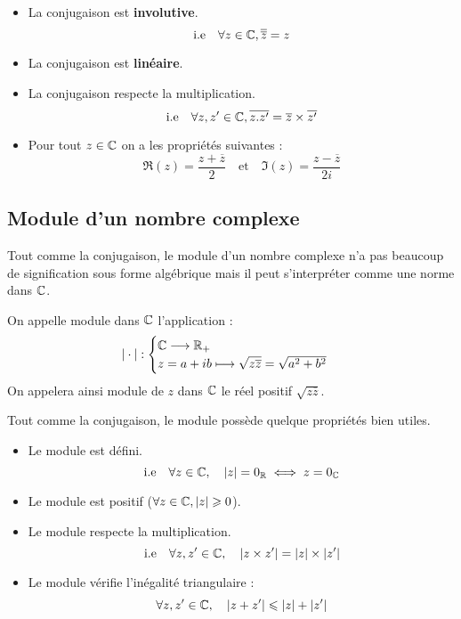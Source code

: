 \begin{prop}[Conjugaison]
    \begin{itemize}
        \item La conjugaison est \textbf{involutive}. 
            \[ \text{i.e} \quad \forall z \in \mathbb{C}, \overline{\overline{z}} = z \] 
        \item La conjugaison est \textbf{linéaire}. 
        \item La conjugaison respecte la multiplication. 
            \[ \text{i.e} \quad \forall z,z' \in \mathbb{C}, \overline{z . z'} = \overline{z} \times \overline{z'} \]
        \item Pour tout $z \in \mathbb{C}$ on a les propriétés suivantes : 
            \[ \Re(z) = \frac{z + \overline{z}}{2} \quad \text{et} \quad \Im(z) = \frac{z - \overline{z}}{2i} \] 
    \end{itemize}
\end{prop}

\subsection{Module d'un nombre complexe}

Tout comme la conjugaison, le module d'un nombre complexe n'a pas beaucoup de signification sous forme algébrique 
mais il peut s'interpréter comme une norme dans $\mathbb{C}$. 

\begin{definition}
    On appelle module dans $\mathbb{C}$ l'application : 
        \[ | \cdot | : 
            \begin{cases}
                \mathbb{C} \longrightarrow \mathbb{R}_+ \\ 
                z = a + ib \longmapsto \sqrt{z \overline{z}} = \sqrt{a^2 + b^2}
            \end{cases} \] 
    On appelera ainsi module de $z$ dans $\mathbb{C}$ le réel positif $\sqrt{z \overline{z}}$. 
\end{definition}

Tout comme la conjugaison, le module possède quelque propriétés bien utiles. 

\begin{prop}[Module]
    \begin{itemize}
        \item Le module est défini. 
            \[ \text{i.e} \quad \forall z \in \mathbb{C}, \quad | z | = 0_{\mathbb{R}} \iff z = 0_{\mathbb{C}} \] 
        \item Le module est positif ($ \forall z \in \mathbb{C}, |z| \geqslant 0$). 
        \item Le module respecte la multiplication. 
            \[ \text{i.e} \quad \forall z, z' \in \mathbb{C}, \quad | z \times z'| = |z| \times |z'| \] 
        \item Le module vérifie l'inégalité triangulaire :
            \[ \forall z, z' \in \mathbb{C}, \quad | z + z' | \leqslant | z | + |z '| \] 
    \end{itemize}
\end{prop}

